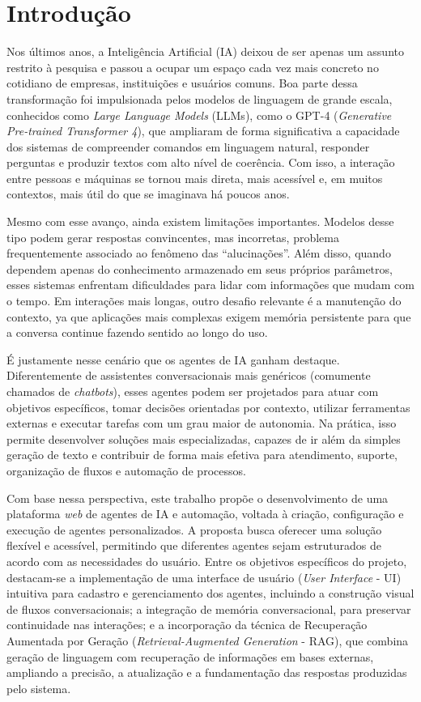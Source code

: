 \documentclass[12pt, openright, oneside, a4paper, brazil]{ads-unipac-abntex2}
\begin{document}
\chapter[Introdução]{Introdução}
Nos últimos anos, a Inteligência Artificial (IA) deixou de ser apenas um assunto restrito à pesquisa e passou a ocupar um espaço cada vez mais concreto no cotidiano de empresas, instituições e usuários comuns. Boa parte dessa transformação foi impulsionada pelos modelos de linguagem de grande escala, conhecidos como \textit{Large Language Models} (LLMs), como o GPT-4 (\textit{Generative Pre-trained Transformer 4}), que ampliaram de forma significativa a capacidade dos sistemas de compreender comandos em linguagem natural, responder perguntas e produzir textos com alto nível de coerência. Com isso, a interação entre pessoas e máquinas se tornou mais direta, mais acessível e, em muitos contextos, mais útil do que se imaginava há poucos anos. 

Mesmo com esse avanço, ainda existem limitações importantes. Modelos desse tipo podem gerar respostas convincentes, mas incorretas, problema frequentemente associado ao fenômeno das ``alucinações''. Além disso, quando dependem apenas do conhecimento armazenado em seus próprios parâmetros, esses sistemas enfrentam dificuldades para lidar com informações que mudam com o tempo. Em interações mais longas, outro desafio relevante é a manutenção do contexto, ya que aplicações mais complexas exigem memória persistente para que a conversa continue fazendo sentido ao longo do uso. 

É justamente nesse cenário que os agentes de IA ganham destaque. Diferentemente de assistentes conversacionais mais genéricos (comumente chamados de \textit{chatbots}), esses agentes podem ser projetados para atuar com objetivos específicos, tomar decisões orientadas por contexto, utilizar ferramentas externas e executar tarefas com um grau maior de autonomia. Na prática, isso permite desenvolver soluções mais especializadas, capazes de ir além da simples geração de texto e contribuir de forma mais efetiva para atendimento, suporte, organização de fluxos e automação de processos. 

Com base nessa perspectiva, este trabalho propõe o desenvolvimento de uma plataforma \textit{web} de agentes de IA e automação, voltada à criação, configuração e execução de agentes personalizados. A proposta busca oferecer uma solução flexível e acessível, permitindo que diferentes agentes sejam estruturados de acordo com as necessidades do usuário. Entre os objetivos específicos do projeto, destacam-se a implementação de uma interface de usuário (\textit{User Interface} - UI) intuitiva para cadastro e gerenciamento dos agentes, incluindo a construção visual de fluxos conversacionais; a integração de memória conversacional, para preservar continuidade nas interações; e a incorporação da técnica de Recuperação Aumentada por Geração (\textit{Retrieval-Augmented Generation} - RAG), que combina geração de linguagem com recuperação de informações em bases externas, ampliando a precisão, a atualização e a fundamentação das respostas produzidas pelo sistema. 
\end{document}
